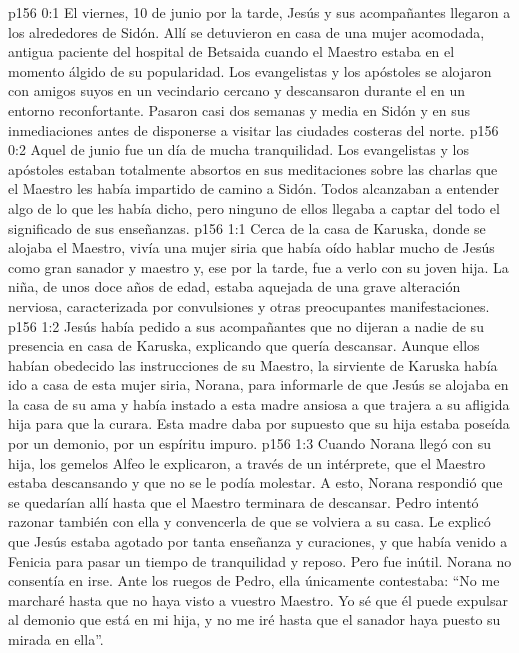 \author{Comisión de seres intermedios}
\vs p156 0:1 El viernes, 10 de junio por la tarde, Jesús y sus acompañantes llegaron a los alrededores de Sidón. Allí se detuvieron en casa de una mujer acomodada, antigua paciente del hospital de Betsaida cuando el Maestro estaba en el momento álgido de su popularidad. Los evangelistas y los apóstoles se alojaron con amigos suyos en un vecindario cercano y descansaron durante el  en un entorno reconfortante. Pasaron casi dos semanas y media en Sidón y en sus inmediaciones antes de disponerse a visitar las ciudades costeras del norte.
\vs p156 0:2 Aquel  de junio fue un día de mucha tranquilidad. Los evangelistas y los apóstoles estaban totalmente absortos en sus meditaciones sobre las charlas que el Maestro les había impartido de camino a Sidón. Todos alcanzaban a entender algo de lo que les había dicho, pero ninguno de ellos llegaba a captar del todo el significado de sus enseñanzas.
\vs p156 1:1 Cerca de la casa de Karuska, donde se alojaba el Maestro, vivía una mujer siria que había oído hablar mucho de Jesús como gran sanador y maestro y, ese  por la tarde, fue a verlo con su joven hija. La niña, de unos doce años de edad, estaba aquejada de una grave alteración nerviosa, caracterizada por convulsiones y otras preocupantes manifestaciones.
\vs p156 1:2 Jesús había pedido a sus acompañantes que no dijeran a nadie de su presencia en casa de Karuska, explicando que quería descansar. Aunque ellos habían obedecido las instrucciones de su Maestro, la sirviente de Karuska había ido a casa de esta mujer siria, Norana, para informarle de que Jesús se alojaba en la casa de su ama y había instado a esta madre ansiosa a que trajera a su afligida hija para que la curara. Esta madre daba por supuesto que su hija estaba poseída por un demonio, por un espíritu impuro.
\vs p156 1:3 Cuando Norana llegó con su hija, los gemelos Alfeo le explicaron, a través de un intérprete, que el Maestro estaba descansando y que no se le podía molestar. A esto, Norana respondió que se quedarían allí hasta que el Maestro terminara de descansar. Pedro intentó razonar también con ella y convencerla de que se volviera a su casa. Le explicó que Jesús estaba agotado por tanta enseñanza y curaciones, y que había venido a Fenicia para pasar un tiempo de tranquilidad y reposo. Pero fue inútil. Norana no consentía en irse. Ante los ruegos de Pedro, ella únicamente contestaba: “No me marcharé hasta que no haya visto a vuestro Maestro. Yo sé que él puede expulsar al demonio que está en mi hija, y no me iré hasta que el sanador haya puesto su mirada en ella”.
